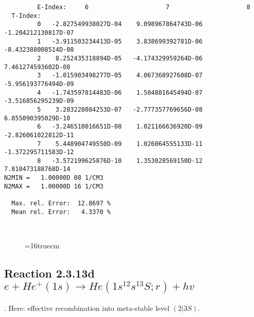 \documentclass[12pt,dvipdfmx]{article}
\begin{document}
\begin{small}
\begin{verbatim}
         E-Index:     6                     7                     8
  T-Index:
         0   -2.827549938027D-04    9.098967864743D-06   -1.204212130817D-07
         1   -3.911503234413D-05    3.838699392781D-06   -8.432388008514D-08
         2    8.252435318894D-05   -4.174329959264D-06    7.461274593602D-08
         3   -1.015903498277D-05    4.067368927608D-07   -5.956193776494D-09
         4   -1.743597814483D-06    1.504881645494D-07   -3.516856295239D-09
         5    3.283228084253D-07   -2.777357769656D-08    6.855090395029D-10
         6   -3.246510016651D-08    1.021166636920D-09   -2.826061022812D-11
         7    5.448904749550D-09    1.026064555133D-11   -1.372295711583D-12
         8   -3.572199625876D-10    1.353028569150D-12    7.810473188768D-14
N2MIN =   1.00000D 08 1/CM3
N2MAX =   1.00000D 16 1/CM3

  Max. rel. Error:  12.8697 %
  Mean rel. Error:   4.3370 %



\end{verbatim}\end{small}
\begin{figure} \label{2.3.13c}
\epsfxsize=16truecm
\end{figure}
\newpage

\subsection{
Reaction 2.3.13d  $e + He^+(1s) \rightarrow He(1s^12s^13S;r) + hv $ }
\cite{kn:Fujimoto}. Here: effective recombination into meta-stable
level $(2|3S)$.
\end{document}
